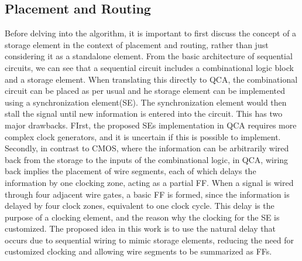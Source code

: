 \subsection{Placement and Routing}
Before delving into the algorithm, it is important to first discuss the concept of a storage element in the context of placement and routing, rather than just considering it as a standalone element. From the basic architecture of sequential circuits, we can see that a sequential circuit includes a combinational logic block and a storage element. When translating this directly to QCA, the combinational circuit can be placed as per usual and he storage element can be implemented using a synchronization element(SE). The synchronization element would then stall the signal until new information is entered into the circuit. This has two major drawbacks. FIrst, the proposed SEs implementation in QCA requires more complex clock generators, and it is uncertain if this is possible to implement. Secondly, in contrast to CMOS, where the information can be arbitrarily wired back from the storage to the inputs of the combinational logic, in QCA, wiring back implies the placement of wire segments, each of which delays the information by one clocking zone, acting as a partial FF. When a signal is wired through four adjacent wire gates, a basic FF is formed, since the information is delayed by four clock zones, equivalent to one clock cycle. This delay is the purpose of a clocking element, and the reason why the clocking for the SE is customized. The proposed idea in this work is to use the natural delay that occurs due to sequential wiring to mimic storage elements, reducing the need for customized clocking and allowing wire segments to be summarized as FFs.

